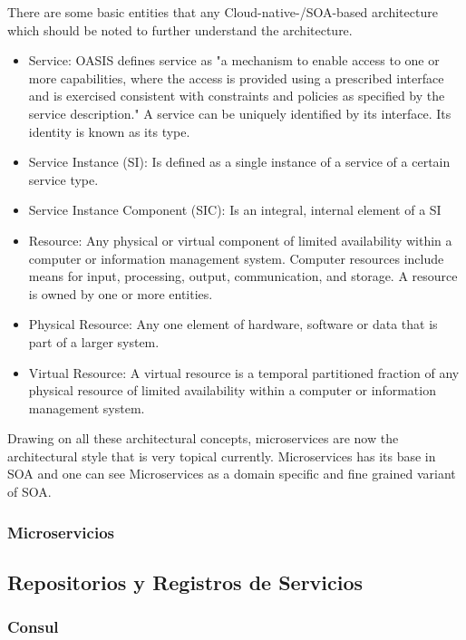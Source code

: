         There are some basic entities that any Cloud-native-/SOA-based architecture which should be noted to further understand the architecture.
        \begin{itemize}
            \item Service: \addref{}OASIS defines service as "a mechanism to enable access to one or more capabilities, where the access is provided using a prescribed interface and is exercised consistent with constraints and policies as specified by the service description." A service can be uniquely identified by its interface. Its identity is known as its type.
            \item Service Instance (SI): Is defined as a single instance of a service of a certain service type.
            \item Service Instance Component (SIC): Is an integral, internal element of a SI
            \item Resource: Any physical or virtual component of limited availability within a computer or information management system. Computer resources include means for input, processing, output, communication, and storage. A resource is owned by one or more entities.
            \item Physical Resource: Any one element of hardware, software or data that is part of a larger system.
            \item Virtual Resource: A virtual resource is a temporal partitioned fraction of any physical resource of limited availability within a computer or information management system.
        \end{itemize}
        
        Drawing on all these architectural concepts, microservices are now the architectural style that is very topical currently. Microservices has its base in SOA and one can see Microservices as a domain specific and fine grained variant of SOA.
        \subsubsection{Microservicios}

	    
	\subsection{Repositorios y Registros de Servicios}

	    \subsubsection{Consul}

